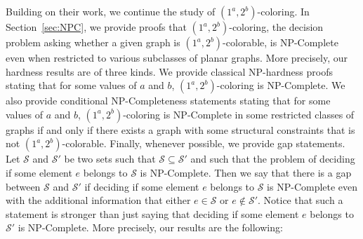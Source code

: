 \documentclass{article}
\newcommand{\colo}[2]{(1^{#1}, 2^{#2})}
\begin{document}
Building on their work, we continue the study of $\colo{a}{b}$-coloring. In Section~\ref{sec:NPC}, we provide proofs that {\sc $\colo{a}{b}$-coloring}, the decision problem asking whether a given graph is $\colo{a}{b}$-colorable, is NP-Complete even when restricted to various subclasses of planar graphs. More precisely, our hardness results are of three kinds. We provide classical NP-hardness proofs stating that for some values of $a$ and $b$, {\sc $\colo{a}{b}$-coloring} is NP-Complete. We also provide conditional NP-Completeness statements stating that for some values of $a$ and $b$, {\sc $\colo{a}{b}$-coloring} is NP-Complete in some restricted classes of graphs if and only if there exists a graph with some structural constraints that is not $\colo{a}{b}$-colorable. Finally, whenever possible, we provide gap statements. Let $\mathcal{S}$ and $\mathcal{S}'$ be two sets such that $\mathcal{S} \subseteq \mathcal{S}'$ and such that the problem of deciding if some element $e$ belongs to $\mathcal{S}$ is NP-Complete. Then we say that there is a gap between $\mathcal{S}$ and $\mathcal{S}'$ if deciding if some element $e$ belongs to $\mathcal{S}$ is NP-Complete even with the additional information that either $e \in \mathcal{S}$ or $e \not\in \mathcal{S}'$. Notice that such a statement is stronger than just saying that deciding if some element $e$ belongs to $\mathcal{S}'$ is NP-Complete. More precisely, our results are the following:
\end{document}
